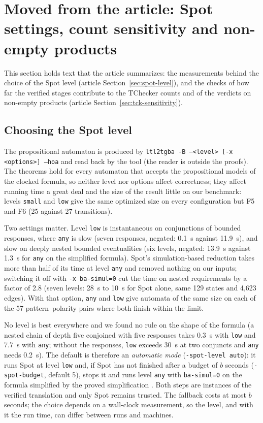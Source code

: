 \section{Moved from the article: Spot settings, count sensitivity and non-empty products}
\label{sec:spot-level-detail}
This section holds text that the article summarizes: the measurements behind the choice of the Spot level (article Section~\ref{sec:spot-level}), and the checks of how far the verified stages contribute to the TChecker counts and of the verdicts on non-empty products (article Section~\ref{sec:tck-sensitivity}).

\subsection{Choosing the Spot level}
The propositional automaton is produced by \texttt{ltl2tgba -B --<level> [-x <options>] --hoa} and read back by the tool (the reader is outside the proofs). The theorems hold for every automaton that accepts the propositional models of the clocked formula, so neither level nor options affect correctness; they affect running time a great deal and the size of the result little on our benchmark: levels \texttt{small} and \texttt{low} give the same optimized size on every configuration but F5 and F6 (25 against 27 transitions).



Two settings matter. Level \texttt{low} is instantaneous on conjunctions of bounded responses, where \texttt{any} is slow (seven responses, negated: 0.1~s against 11.9~s), and slow on deeply nested bounded eventualities (six levels, negated: 13.9~s against 1.3~s for \texttt{any} on the simplified formula). Spot's simulation-based reduction takes more than half of its time at level \texttt{any} and removed nothing on our inputs; switching it off with \texttt{-x ba-simul=0} cut the time on nested requirements by a factor of 2.8 (seven levels: 28~s to 10~s for Spot alone, same 129 states and 4,623 edges). With that option, \texttt{any} and \texttt{low} give automata of the same size on each of the 57 pattern--polarity pairs where both finish within the limit.



No level is best everywhere and we found no rule on the shape of the formula (a nested chain of depth five conjoined with five responses takes 0.3~s with \texttt{low} and 7.7~s with \texttt{any}; without the responses, \texttt{low} exceeds 30~s at two conjuncts and \texttt{any} needs 0.2~s). The default is therefore an \emph{automatic mode} (\texttt{-spot-level auto}): it runs Spot at level \texttt{low} and, if Spot has not finished after a budget of $b$ seconds (\texttt{-spot-budget}, default 5), stops it and runs level \texttt{any} with \texttt{ba-simul=0} on the formula simplified by the proved simplification . Both steps are instances of the verified translation and only Spot remains trusted. The fallback costs at most $b$ seconds; the choice depends on a wall-clock measurement, so the level, and with it the run time, can differ between runs and machines.




